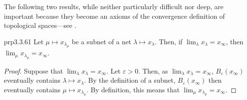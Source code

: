 The following two results, while neither particularly difficult nor deep, are important because they become an axioms of the convergence definition of topological spaces---see .
\begin{prp}{}{prp3.3.61}
Let $\mu \mapsto x_{\lambda _\mu}$ be a subnet of a net $\lambda \mapsto x_\lambda$.  Then, if $\lim _{\lambda}x_{\lambda}=x_{\infty}$, then $\lim _{\mu}x_{\lambda _{\mu}}=x_{\infty}$.
\begin{proof}
Suppose that $\lim _{\lambda}x_{\lambda}=x_{\infty}$.  Let $\varepsilon >0$.  Then, as $\lim _{\lambda}x_{\lambda}=x_{\infty}$, $B_{\varepsilon}(x_{\infty})$ eventually contains $\lambda \mapsto x_{\lambda}$.  By the definition of a subnet, $B_{\varepsilon}(x_{\infty})$ then eventually contains $\mu \mapsto x_{\lambda _{\mu}}$.  By definition, this means that $\lim _{\mu}x_{\lambda _{\mu}}=x_{\infty}$.
\end{proof}
\end{prp}
